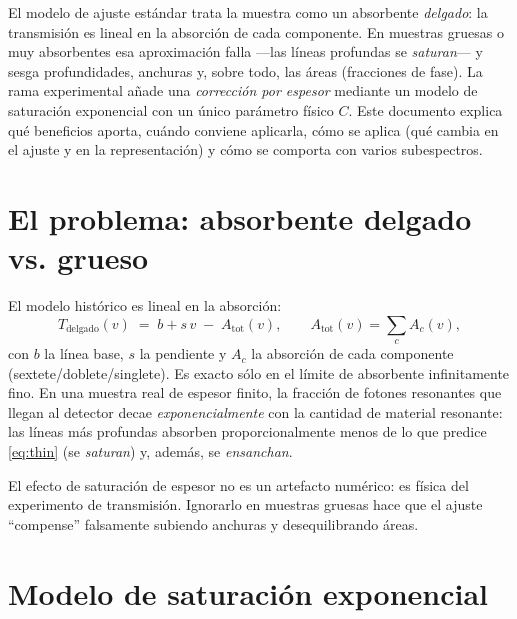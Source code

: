 \noindent
El modelo de ajuste estándar trata la muestra como un absorbente \emph{delgado}:
la transmisión es lineal en la absorción de cada componente. En muestras gruesas
o muy absorbentes esa aproximación falla —las líneas profundas se \emph{saturan}—
y sesga profundidades, anchuras y, sobre todo, las áreas (fracciones de fase).
La rama experimental añade una \emph{corrección por espesor} mediante un modelo de
saturación exponencial con un único parámetro físico $C$. Este documento explica
qué beneficios aporta, cuándo conviene aplicarla, cómo se aplica (qué cambia en el
ajuste y en la representación) y cómo se comporta con varios subespectros.



\bigskip

\section{El problema: absorbente delgado vs. grueso}

El modelo histórico es lineal en la absorción:
\begin{equation}
  T_{\text{delgado}}(v) \;=\; b + s\,v \;-\; A_{\text{tot}}(v),
  \qquad A_{\text{tot}}(v)=\sum_{c} A_c(v),
  \label{eq:thin}
\end{equation}
con $b$ la línea base, $s$ la pendiente y $A_c$ la absorción de cada componente
(sextete/doblete/singlete). Es exacto sólo en el límite de absorbente
infinitamente fino. En una muestra real de espesor finito, la fracción de fotones
resonantes que llegan al detector decae \emph{exponencialmente} con la cantidad de
material resonante: las líneas más profundas absorben proporcionalmente menos de
lo que predice \eqref{eq:thin} (se \emph{saturan}) y, además, se \emph{ensanchan}.

\begin{nota}
El efecto de saturación de espesor no es un artefacto numérico: es física del
experimento de transmisión. Ignorarlo en muestras gruesas hace que el ajuste
``compense'' falsamente subiendo anchuras y desequilibrando áreas.
\end{nota}

\section{Modelo de saturación exponencial}

